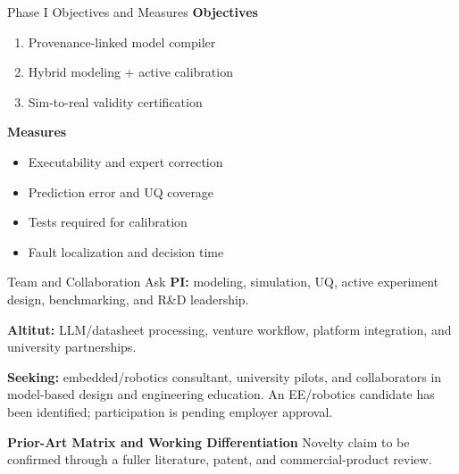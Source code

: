 \documentclass[a4paper,landscape]{article}
\begin{document}
\hfill
\begin{minipage}[t]{0.215\textwidth}
\begin{vmBox}[height=34mm]{Phase I Objectives and Measures}
\textbf{Objectives}
\begin{enumerate}
\item Provenance-linked model compiler
\item Hybrid modeling + active calibration
\item Sim-to-real validity certification
\end{enumerate}

\textbf{Measures}
\begin{itemize}
\item Executability and expert correction
\item Prediction error and UQ coverage
\item Tests required for calibration
\item Fault localization and decision time
\end{itemize}
\end{vmBox}

\vspace{1.7mm}
\begin{vmBox}[height=32mm]{Team and Collaboration Ask}
\textbf{PI:} modeling, simulation, UQ, active experiment design, benchmarking, and R\&D leadership.

\textbf{Altitut:} LLM/datasheet processing, venture workflow, platform integration, and university partnerships.

\textbf{Seeking:} embedded/robotics consultant, university pilots, and collaborators in model-based design and engineering education. An EE/robotics candidate has been identified; participation is pending employer approval.
\end{vmBox}
\end{minipage}

\vspace{1.5mm}

{\fontsize{8.4}{9.0}\selectfont\bfseries\color{VMDark}Prior-Art Matrix and Working Differentiation}
{\fontsize{6.45}{7.1}\selectfont\color{black!66}\quad Novelty claim to be confirmed through a fuller literature, patent, and commercial-product review.}
\end{document}
